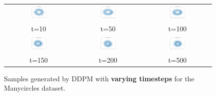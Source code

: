 \documentclass[11pt]{article}
\begin{document}
\begin{figure}[H]
    \centering
    \begin{tabular}{ccc}
        \includegraphics[width=0.3\textwidth]{exps/ddpm_2_10_0.0001_0.02_manycircles/samples_10.png} &
        \includegraphics[width=0.3\textwidth]{exps/ddpm_2_50_0.0001_0.02_manycircles/samples_50.png} &
        \includegraphics[width=0.3\textwidth]{exps/ddpm_2_100_0.0001_0.02_manycircles/samples_100.png} \\
        t=10 & t=50 & t=100 \\[0.5em]
        
        \includegraphics[width=0.3\textwidth]{exps/ddpm_2_150_0.0001_0.02_manycircles/samples_150.png} &
        \includegraphics[width=0.3\textwidth]{exps/ddpm_2_200_0.0001_0.02_manycircles/samples_200.png} &
        \includegraphics[width=0.3\textwidth]{exps/ddpm_2_500_0.0001_0.02_manycircles/samples_500.png} \\
        t=150 & t=200 & t=500 \\
    \end{tabular}
    \caption{Samples generated by DDPM with \textbf{varying timesteps} for the Manycircles dataset.}
    \label{fig:timesteps_manycircles}
\end{figure}
\end{document}
